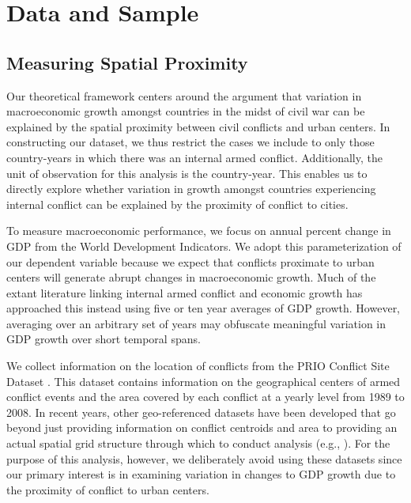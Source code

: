 \section{Data and Sample}
\label{empirics}

\subsection{Measuring Spatial Proximity}

Our theoretical framework centers around the argument that variation in macroeconomic growth amongst countries in the midst of civil war can be explained by the spatial proximity between civil conflicts and urban centers. In constructing our dataset, we thus restrict the cases we include to only those country-years in which there was an internal armed conflict. Additionally, the unit of observation for this analysis is the country-year. This enables us to directly explore whether variation in growth amongst countries experiencing internal conflict can be explained by the proximity of conflict to cities.

To measure macroeconomic performance, we focus on annual percent change in GDP from the World Development Indicators. We adopt this parameterization of our dependent variable because we expect that conflicts proximate to urban centers will generate abrupt changes in macroeconomic growth. Much of the extant literature linking internal armed conflict and economic growth has approached this instead using five or ten year averages of GDP growth. However, averaging over an arbitrary set of years may obfuscate meaningful variation in GDP growth over short temporal spans.

We collect information on the location of conflicts from the PRIO Conflict Site Dataset \citep{hallberg:2012}. This dataset contains information on the geographical centers of armed conflict events and the area covered by each conflict at a yearly level from 1989 to 2008. In recent years, other geo-referenced datasets have been developed that go beyond just providing information on conflict centroids and area to providing an actual spatial grid structure through which to conduct analysis (e.g., \citealt{tollefsen:etal:2012}). For the purpose of this analysis, however, we deliberately avoid using these datasets since our primary interest is in examining variation in changes to GDP growth due to the proximity of conflict to urban centers. 


